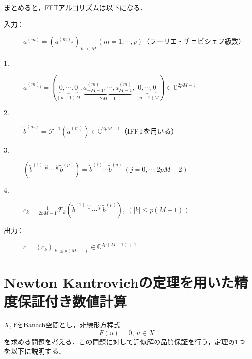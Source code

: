 \documentclass[11pt,a4paper]{jsarticle}
\theoremstyle{definition}
\begin{document}
まとめると，FFTアルゴリズムは以下になる．
\begin{screen}
  \begin{description}
    \item[入力：]$a^{(m)}=\left( a^{(m)_k} \right)_{|k|<M}\ (m=1,\cdots,p)$（フーリエ・チェビシェフ級数）
    \item[1.] $\tilde{a}^{(m)_j} = \left( \underbrace{0,\cdots,0}_{(p-1)M}, \underbrace{a_{-M+1}^{(m)},\cdots,a_{M-1}^{(m)}}_{2M-1},\underbrace{{0,\cdots,0}}_{(p-1)M}\right) \in \mathbb{C}^{2pM-1}$
    \item[2.] $\tilde{b}^{(m)}=\mathcal{F}^{-1} (\tilde{a}^{(m)}) \in \mathbb{C}^{2pM-1}$（IFFTを用いる）
    \item[3.] $\left( \tilde{b}^{(1)} \hat* \cdots \hat* \tilde{b}^{(p)} \right) = \tilde{b}^{(1)} \cdots \tilde{b}^{(p)}\ \left(j=0,\cdots,2pM-2\right)$
    \item[4.] $c_k = \frac{1}{2pM-1} \mathcal{F}_k \left( \tilde{b}^{(1)} \hat* \cdots \hat* \tilde{b}^{(p)} \right),\ (|k| \leq p(M-1))$
    \item[出力：] $c=\left( c_k \right)_{|k|\leq p(M-1)} \in \mathbb{C}^{2p(M-1)+1}$
  \end{description}
\end{screen}

\newpage
\section{Newton Kantrovichの定理を用いた精度保証付き数値計算}
$X,Y$をBanach空間とし，非線形方程式
\begin{equation*}
  F(u)=0,\ u\in X
\end{equation*}
を求める問題を考える．この問題に対して近似解の品質保証を行う，定理の1つを以下に説明する．
\end{document}
